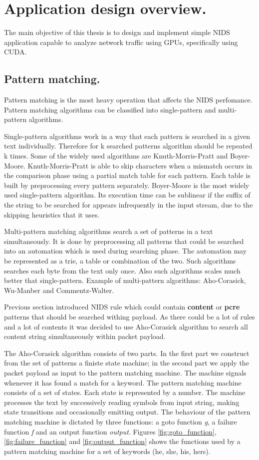 \documentclass[thesis=M,english]{FITthesis}[2011/07/15]
\begin{document}
\section{Application design overview.}
The main objective of this thesis is to design and implement simple NIDS application capable to analyze network traffic using GPUs, specifically using CUDA. 
\subsection*{Pattern matching.}
Pattern matching is the most heavy operation that affects the NIDS perfomance. Pattern matching algorithms can be classified into single-pattern and multi-pattern algorithms.

Single-pattern algorithms work in a way that each pattern is searched in a given text individually. Therefore for k searched patterns algorithm should be repeated k times. Some of the widely used algorithms are Knuth-Morris-Pratt and Boyer-Moore. Knuth-Morris-Pratt is able to skip characters when a mismatch occurs in the comparison phase using a partial match table for each pattern. Each table is built by preprocessing every pattern separately. Boyer-Moore is the most widely used single-pattern algorithm. Its execution time can be sublinear if the suffix of the string to be searched for appears infrequently in the input stream, due to the skipping heuristics that it uses.

Multi-pattern matching algorithms search a set of patterns in a text simultaneously. It is done by preprocessing all patterns that could be searched into an automation which is used during searching phase. The automation may be represented as a trie, a table or combination of the two. Such algorithms searches each byte from the text only once. Also such algorithms scales much better that single-pattern. Example of multi-pattern algorithms: Aho-Corasick, Wu-Manber and Commentz-Walter.

Previous section introduced NIDS rule which could contain \textbf{content} or \textbf{pcre} patterns that should be searched withing payload. As there could be a lot of rules and a lot of contents it was decided to use Aho-Corasick algorithm to search all content string simultaneously within packet payload. 

The Aho-Corasick algorithm consists of two parts. In the first part we construct from the set of patterns a finiste state machine; in the second part we apply the packet payload as input to the pattern matching machine. The machine signals whenever it has found a match for a keyword. The pattern matching machine consists of a set of states. Each state is represented by a number. The machine processes the text by successively reading symbols from input string, making state transitions and occasionally emitting output. The behaviour of the pattern matching machine is dictated by three functions: a goto function \emph{g}, a failure function \emph{f} and an output function \emph{output}. Figures \ref{fig:goto_function}, \ref{fig:failure_function} and \ref{fig:output_function} shows the functions used by a pattern matching machine for a set of keywords (he, she, his, hers).
\end{document}
